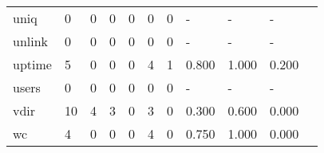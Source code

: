 \begin{longtable}{lp{1.2cm}p{1.2cm}p{1.2cm}p{1.2cm}p{1.2cm}p{1.2cm}p{1.2cm}p{1.2cm}p{1.2cm}p{1.2cm}}
uniq      &                                     0 &                                                  0 &                                                0 &                                               0 &                                                0 &                                              0 &                                                  - &                                                  - &                                                  - \\
unlink    &                                     0 &                                                  0 &                                                0 &                                               0 &                                                0 &                                              0 &                                                  - &                                                  - &                                                  - \\
uptime    &                                     5 &                                                  0 &                                                0 &                                               0 &                                                4 &                                              1 &                                              0.800 &                                              1.000 &                                              0.200 \\
users     &                                     0 &                                                  0 &                                                0 &                                               0 &                                                0 &                                              0 &                                                  - &                                                  - &                                                  - \\
vdir      &                                    10 &                                                  4 &                                                3 &                                               0 &                                                3 &                                              0 &                                              0.300 &                                              0.600 &                                              0.000 \\
wc        &                                     4 &                                                  0 &                                                0 &                                               0 &                                                4 &                                              0 &                                              0.750 &                                              1.000 &                                              0.000 \\

\end{longtable}
